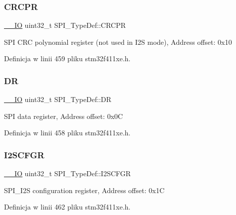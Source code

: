 \subsubsection{\texorpdfstring{C\+R\+C\+PR}{CRCPR}}
{\footnotesize\ttfamily \hyperlink{core__sc300_8h_aec43007d9998a0a0e01faede4133d6be}{\+\_\+\+\_\+\+IO} uint32\+\_\+t S\+P\+I\+\_\+\+Type\+Def\+::\+C\+R\+C\+PR}

S\+PI C\+RC polynomial register (not used in I2S mode), Address offset\+: 0x10 

Definicja w linii 459 pliku stm32f411xe.\+h.

\mbox{\label{struct_s_p_i___type_def_a02ef206dd5bb270e1f17fedd71284422}} 
\subsubsection{\texorpdfstring{DR}{DR}}
{\footnotesize\ttfamily \hyperlink{core__sc300_8h_aec43007d9998a0a0e01faede4133d6be}{\+\_\+\+\_\+\+IO} uint32\+\_\+t S\+P\+I\+\_\+\+Type\+Def\+::\+DR}

S\+PI data register, Address offset\+: 0x0C 

Definicja w linii 458 pliku stm32f411xe.\+h.

\mbox{\label{struct_s_p_i___type_def_a4a1547c0ed26f31108910c35d2876b83}} 
\subsubsection{\texorpdfstring{I2\+S\+C\+F\+GR}{I2SCFGR}}
{\footnotesize\ttfamily \hyperlink{core__sc300_8h_aec43007d9998a0a0e01faede4133d6be}{\+\_\+\+\_\+\+IO} uint32\+\_\+t S\+P\+I\+\_\+\+Type\+Def\+::\+I2\+S\+C\+F\+GR}

S\+P\+I\+\_\+\+I2S configuration register, Address offset\+: 0x1C 

Definicja w linii 462 pliku stm32f411xe.\+h.

\mbox{\label{struct_s_p_i___type_def_aff2f386a2566c722f7962377b495f1a2}} 

